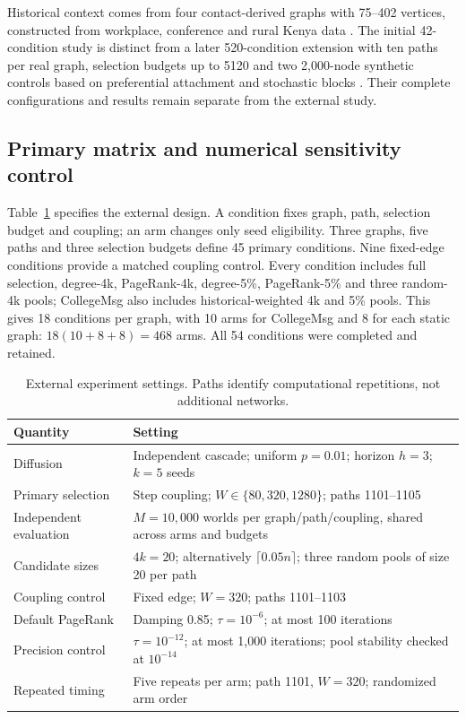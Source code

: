 \documentclass[smallextended]{svjour3}
\begin{document}
Historical context comes from four contact-derived graphs with 75--402 vertices, constructed from workplace, conference and rural Kenya data \cite{ref3,ref4,ref5,ref6}. The initial 42-condition study is distinct from a later 520-condition extension with ten paths per real graph, selection budgets up to 5120 and two 2,000-node synthetic controls based on preferential attachment and stochastic blocks \cite{ref17,ref18}. Their complete configurations and results remain separate from the external study.

\subsection{Primary matrix and numerical sensitivity control}
Table~\ref{tab:settings} specifies the external design. A condition fixes graph, path, selection budget and coupling; an arm changes only seed eligibility. Three graphs, five paths and three selection budgets define 45 primary conditions. Nine fixed-edge conditions provide a matched coupling control. Every condition includes full selection, degree-4k, PageRank-4k, degree-5\%, PageRank-5\% and three random-4k pools; CollegeMsg also includes historical-weighted 4k and 5\% pools. This gives 18 conditions per graph, with 10 arms for CollegeMsg and 8 for each static graph: $18(10+8+8)=468$ arms. All 54 conditions were completed and retained.

\begin{table}[htbp]
\caption{External experiment settings. Paths identify computational repetitions, not additional networks.}\label{tab:settings}
\begin{tabularx}{\linewidth}{lX}
\toprule
Quantity & Setting \\
\midrule
Diffusion & Independent cascade; uniform $p=0.01$; horizon $h=3$; $k=5$ seeds \\
Primary selection & Step coupling; $W\in\{80,320,1280\}$; paths 1101--1105 \\
Independent evaluation & $M=10,000$ worlds per graph/path/coupling, shared across arms and budgets \\
Candidate sizes & $4k=20$; alternatively $\lceil0.05n\rceil$; three random pools of size 20 per path \\
Coupling control & Fixed edge; $W=320$; paths 1101--1103 \\
Default PageRank & Damping 0.85; $\tau=10^{-6}$; at most 100 iterations \\
Precision control & $\tau=10^{-12}$; at most 1,000 iterations; pool stability checked at $10^{-14}$ \\
Repeated timing & Five repeats per arm; path 1101, $W=320$; randomized arm order \\
\bottomrule
\end{tabularx}
\end{table}
\end{document}
